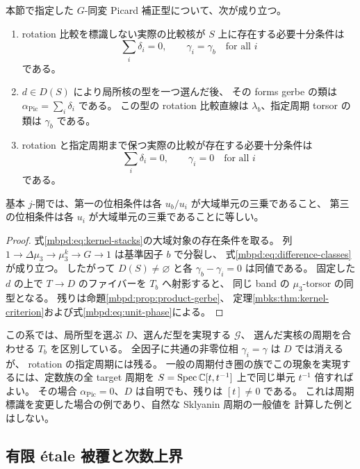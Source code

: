 \begin{corollary}[二段階の降下条件]
\label{mbpd:cor:descent-criterion}
本節で指定した $G$-同変 Picard 補正型について、次が成り立つ。
\begin{enumerate}
 \item rotation 比較を標識しない実際の比較核が $S$ 上に存在する必要十分条件は
 \[
   \sum_i\delta_i=0,\qquad
   \gamma_i=\gamma_b\quad\text{for all }i
 \]
 である。
 \item $d\in D(S)$ により局所核の型を一つ選んだ後、
 その forms gerbe の類は $\alpha_{\mathrm{Pic}}=\sum_i\delta_i$ である。
 この型の rotation 比較直線は $\lambda_b$、指定周期 torsor の類は $\gamma_b$ である。
 \item rotation と指定周期まで保つ実際の比較が存在する必要十分条件は
 \[
   \sum_i\delta_i=0,\qquad \gamma_i=0\quad\text{for all }i
 \]
 である。
\end{enumerate}
基本 $j$-開では、第一の位相条件は各 $u_b/u_i$ が大域単元の三乗であること、
第三の位相条件は各 $u_i$ が大域単元の三乗であることに等しい。
\end{corollary}
\begin{proof}
式\eqref{mbpd:eq:kernel-stacks}の大域対象の存在条件を取る。
列 $1\to\Delta\mu_3\to\mu_3^k\to G\to1$ は基準因子 $b$ で分裂し、
式\eqref{mbpd:eq:difference-classes}が成り立つ。
したがって $D(S)\ne\varnothing$ と各 $\gamma_b-\gamma_i=0$ は同値である。
固定した $d$ の上で $T\to D$ のファイバーを $T_b$ へ射影すると、
同じ band の $\mu_3$-torsor の同型となる。
残りは命題\ref{mbpd:prop:product-gerbe}、
定理\ref{mbks:thm:kernel-criterion}および式\eqref{mbpd:eq:unit-phase}による。
\end{proof}

この系では、局所型を選ぶ $D$、選んだ型を実現する $\mathscr G$、
選んだ実核の周期を合わせる $T_b$ を区別している。
全因子に共通の非零位相 $\gamma_i=\gamma$ は $D$ では消えるが、
rotation の指定周期には残る。
一般の周期付き圏の族でこの現象を実現するには、定数族の全 target 周期を
$S=\operatorname{Spec}\mathbb C[t,t^{-1}]$ 上で同じ単元 $t^{-1}$ 倍すればよい。
その場合 $\alpha_{\mathrm{Pic}}=0$、$D$ は自明でも、残りは $[t]\ne0$ である。
これは周期標識を変更した場合の例であり、自然な Sklyanin 周期の一般値を
計算した例とはしない。

\subsection{有限 \'etale 被覆と次数上界}

